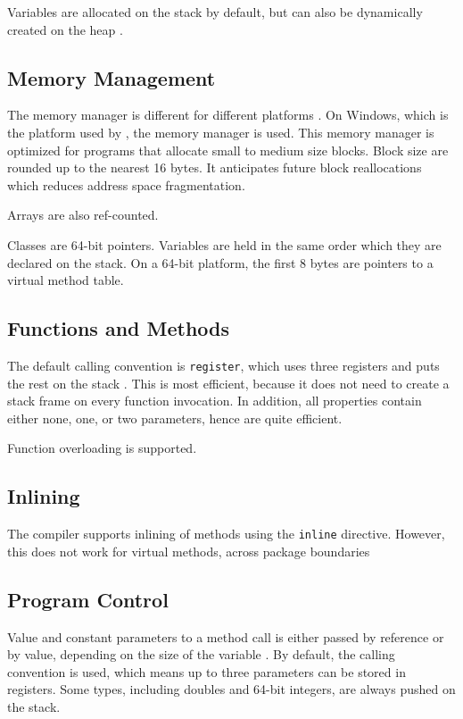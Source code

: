 Variables are allocated on the stack by default, but can also be dynamically created on the heap \cite{noauthor_undated-lw}.

\subsection{Memory Management}
\label{sub:Memory Management}
The memory manager is different for different platforms \cite{noauthor_undated-ys}. On Windows, which is the platform used by \gap, the  memory manager is used. This memory manager is optimized for programs that allocate small to medium size blocks. Block size are rounded up to the nearest 16 bytes. It anticipates future block reallocations which reduces address space fragmentation.

Arrays are also ref-counted.

Classes are 64-bit pointers. Variables are held in the same order which they are declared on the stack. On a 64-bit platform, the first 8 bytes are pointers to a virtual method table.

\subsection{Functions and Methods}
\label{sub:Functions and Methods}
The default calling convention is \texttt{register}, which uses three registers and puts the rest on the stack \cite{noauthor_undated-xi}. This is most efficient, because it does not need to create a stack frame on every function invocation. In addition, all properties contain either none, one, or two parameters, hence are quite efficient. 

Function overloading is supported.

\subsection{Inlining}
\label{sub:Inlining}
The compiler supports inlining of methods using the \texttt{inline} directive. However, this does not work for virtual methods, across package boundaries \cite{noauthor_undated-rx} 

\subsection{Program Control}
\label{sub:Program Control}
Value and constant parameters to a method call is either passed by reference or by value, depending on the size of the variable \cite{noauthor_undated-ae}. By default, the  calling convention is used, which means up to three parameters can be stored in registers. Some types, including doubles and 64-bit integers, are always pushed on the stack.

